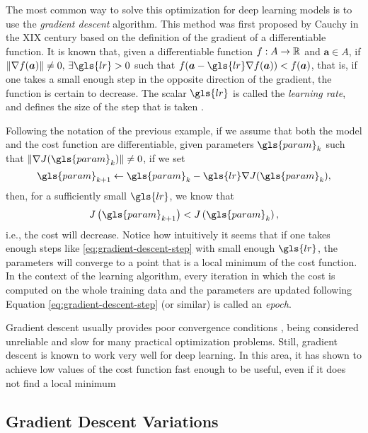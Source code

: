 The most common way to solve this optimization for deep learning models is to use the \textit{gradient descent} algorithm.
This method was first proposed by Cauchy in the XIX century \cite{lemarechal_cauchy_2012} based on the definition of the gradient of a differentiable function.
It is known that, given a differentiable function $f:A\to\mathbb{R}$ and $\bm{a} \in A$, if $\| \nabla f(\bm{a}) \| \neq 0,\,\exists \gls{lr} > 0$ such that $f(\bm{a} - \gls{lr} \nabla f(\bm{a})) < f(\bm{a})$, that is, if one takes a small enough step in the opposite direction of the gradient, the function is certain to decrease.
The scalar $\gls{lr}$ is called the \textit{learning rate}, and defines the size of the step that is taken \cite{goodfellow_deep_2016}.

Following the notation of the previous example, if we assume that both the model and the cost function are differentiable, given parameters $\gls{param}_k$ such that $\| \nabla J(\gls{param}_k) \| \neq 0$, if we set
\begin{equation}\label{eq:gradient-descent-step}
\gls{param}_{k+1} \gets \gls{param}_k - \gls{lr} \nabla J(\gls{param}_k) 
,\end{equation}
then, for a sufficiently small $\gls{lr}$, we know that \[
J\left( \gls{param}_{k+1} \right) < J\left( \gls{param}_k \right) 
,\] i.e., the cost will decrease.
Notice how intuitively it seems that if one takes enough steps like \eqref{eq:gradient-descent-step} with small enough $\gls{lr}$, the parameters will converge to a point that is a local minimum of the cost function.
In the context of the learning algorithm, every iteration in which the cost is computed on the whole training data and the parameters are updated following Equation \eqref{eq:gradient-descent-step} (or similar) is called an \emph{epoch}.


Gradient descent usually provides poor convergence conditions \cite{wolfe_convergence_1969}, being considered unreliable and slow for many practical optimization problems.
Still, gradient descent is known to work very well for deep learning.
In this area, it has shown to achieve low values of the cost function fast enough to be useful, even if it does not find a local minimum \cite{goodfellow_deep_2016}

\subsection{Gradient Descent Variations}

